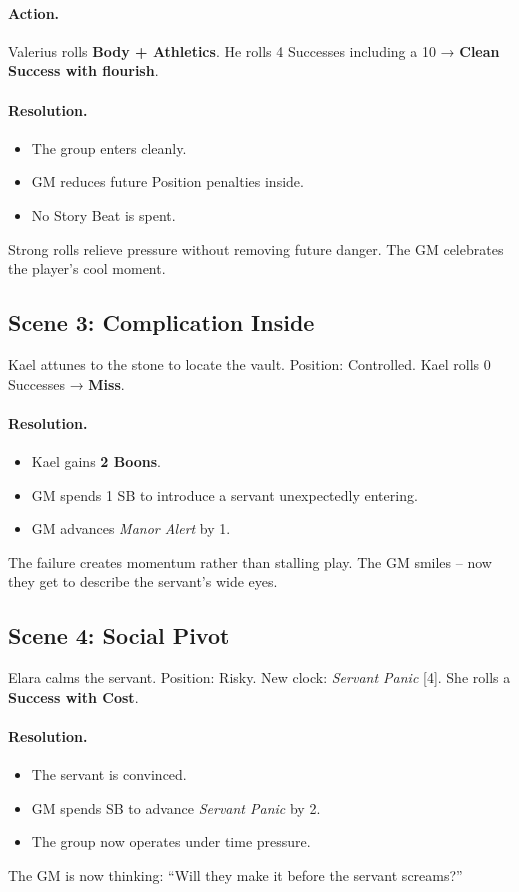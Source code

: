 \paragraph{Action.} Valerius rolls \textbf{Body + Athletics}.  
He rolls 4 Successes including a 10 → \textbf{Clean Success with flourish}.

\paragraph{Resolution.}
\begin{itemize}
  \item The group enters cleanly.
  \item GM reduces future Position penalties inside.
  \item No Story Beat is spent.
\end{itemize}
Strong rolls relieve pressure without removing future danger. The GM celebrates the player’s cool moment.

\subsection*{Scene 3: Complication Inside}
Kael attunes to the stone to locate the vault. Position: Controlled.  
Kael rolls 0 Successes → \textbf{Miss}.

\paragraph{Resolution.}
\begin{itemize}
  \item Kael gains \textbf{2 Boons}.
  \item GM spends 1 SB to introduce a servant unexpectedly entering.
  \item GM advances \emph{Manor Alert} by 1.
\end{itemize}
The failure creates momentum rather than stalling play. The GM smiles – now they get to describe the servant’s wide eyes.

\subsection*{Scene 4: Social Pivot}
Elara calms the servant. Position: Risky.  
New clock: \emph{Servant Panic} [4].  
She rolls a \textbf{Success with Cost}.

\paragraph{Resolution.}
\begin{itemize}
  \item The servant is convinced.
  \item GM spends SB to advance \emph{Servant Panic} by 2.
  \item The group now operates under time pressure.
\end{itemize}
The GM is now thinking: “Will they make it before the servant screams?”

